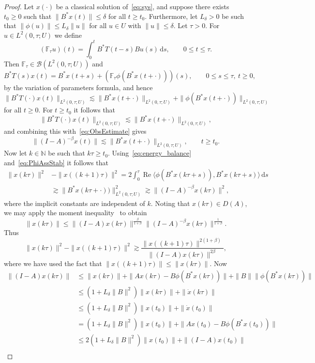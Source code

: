 \documentclass[11pt, a4paper]{amsart}
\DeclareMathOperator*{\R}{Re}
\newcommand{\dd}{\mathrm{d}}
\newcommand{\B}{\mathcal{B}}
\newcommand{\NN}{\mathbb{N}}
\theoremstyle{definition}
\numberwithin{equation}{section}
\begin{document}
\begin{proof}
Let $x(\cdot)$ be a classical solution of~\eqref{eq:sys}, and suppose there exists $t_0\ge0$ such that $\|B^*x(t)\|\le\delta$ for all $t\ge t_0$. Furthermore, let $L_\delta>0$ be such that $\|\phi(u)\|\le L_\delta\|u\|$ for all $u\in U$ with $\|u\|\le\delta$. Let $\tau>0$. For $u\in L^2(0,\tau;U)$ we define 
 $$(\mathbb{F}_\tau u)(t)=\int_0^t B^\ast T(t-s)Bu(s)\,\dd s,\qquad 0\le t\le\tau.$$
Then $\mathbb{F}_\tau\in \B(L^2(0,\tau;U))$ and 
$$B^\ast T(s)x(t) = B^\ast x(t+s)+ (\mathbb{F}_\tau\phi(B^\ast x(t+\cdot)))(s),\qquad 0\le s\le\tau,\ t\ge0,$$
by the variation of parameters formula, and hence
$$
\|B^\ast T(\cdot)x(t)\|_{L^2(0,\tau;U)}\lesssim\|B^\ast x(t+\cdot)\|_{L^2(0,\tau;U)}+\|\phi(B^\ast x(t+\cdot))\|_{L^2(0,\tau;U)}
$$
for all $t\ge0$. For $t\ge t_0$ it follows that 
$$\|B^\ast T(\cdot)x(t)\|_{L^2(0,\tau;U)}\lesssim\|B^\ast x(t+\cdot)\|_{L^2(0,\tau;U)},$$
 and combining this with~\eqref{eq:ObsEstimate} gives
$$\|(I-A)^{-\beta} x(t)\|
\lesssim  \|B^\ast x(t+\cdot)\|_{L^2(0,\tau;U)}, \qquad t\ge t_0.$$
Now let $k\in\NN$ be such that $k\tau\ge t_0$. Using~\eqref{eq:energy_balance} and~\eqref{eq:PhiAssStab} it follows that
$$\begin{aligned}
\|x(k\tau)\|^2&-\|x((k+1)\tau)\|^2= 2\int_0^\tau \R \langle \phi(B^\ast x(k\tau+s)),B^\ast x(k\tau+s)\rangle\, \dd s\\
&\gtrsim \|B^\ast x(k\tau+\cdot))\|_{L^2(0,\tau;U)}^2\gtrsim\|(I-A)^{-\beta}x(k\tau) \|^2,
\end{aligned}
$$
where the implicit constants are independent of $k$. Noting that $x(k\tau)\in D(A)$, we may apply the moment inequality~\cite[Thm.~II.5.34]{EngNag00book} to obtain
$$\|x(k\tau)\|\le \|(I-A)x(k\tau)\|^{\frac{\beta}{1+\beta}}\|(I-A)^{-\beta}x(k\tau)\|^{\frac{1}{1+\beta}}.$$
Thus
$$
\|x(k\tau)\|^2-\|x((k+1)\tau)\|^2\gtrsim\frac{\|x((k+1)\tau)\|^{2(1+\beta)}}{\|(I-A)x(k\tau)\|^{2\beta}},
$$
where we have used the fact that $\|x((k+1)\tau)\|\le\|x(k\tau)\|$. Now
$$\begin{aligned}
\|(I-A)x(k\tau)\|&\le \|x(k\tau)\|+\|Ax(k\tau)-B\phi(B^* x(k\tau))\|+\|B\|\|\phi(B^*x(k\tau))\|\\
&\le (1+L_\delta\|B\|^2)\|x(k\tau)\|+\|\dot{x}(k\tau)\|\\
&\le (1+L_\delta\|B\|^2)\|x(t_0)\|+\|\dot{x}(t_0)\|\\
&=(1+L_\delta\|B\|^2)\|x(t_0)\|+\|Ax(t_0)-B\phi(B^*x(t_0))\|\\
&\le 2(1+L_\delta\|B\|^2)\|x(t_0)\|+\|(I-A)x(t_0)\|\\

\end{aligned}$$
\end{proof}
\end{document}
